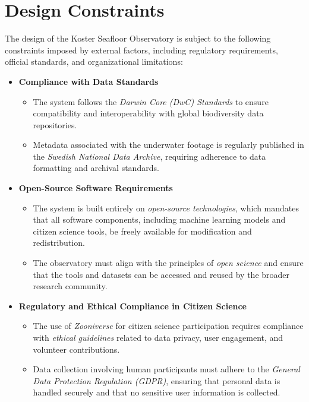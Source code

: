 \section{Design Constraints}

The design of the Koster Seafloor Observatory is subject to the following constraints imposed by external factors, including regulatory requirements, official standards, and organizational limitations:

\begin{itemize}
    \item \textbf{Compliance with Data Standards}  
    \begin{itemize}
        \item The system follows the \textit{Darwin Core (DwC) Standards} \cite{anton2021kso} to ensure compatibility and interoperability with global biodiversity data repositories.
        \item Metadata associated with the underwater footage is regularly published in the \textit{Swedish National Data Archive}, requiring adherence to data formatting and archival standards.
    \end{itemize}
    
    \item \textbf{Open-Source Software Requirements}  
    \begin{itemize}
        \item The system is built entirely on \textit{open-source technologies}, which mandates that all software components, including machine learning models and citizen science tools, be freely available for modification and redistribution.
        \item The observatory must align with the principles of \textit{open science} and ensure that the tools and datasets can be accessed and reused by the broader research community.
    \end{itemize}

    \item \textbf{Regulatory and Ethical Compliance in Citizen Science}  
    \begin{itemize}
        \item The use of \textit{Zooniverse} for citizen science participation requires compliance with \textit{ethical guidelines} related to data privacy, user engagement, and volunteer contributions.
        \item Data collection involving human participants must adhere to the \textit{General Data Protection Regulation (GDPR)}, ensuring that personal data is handled securely and that no sensitive user information is collected.
    \end{itemize}


\end{itemize}
